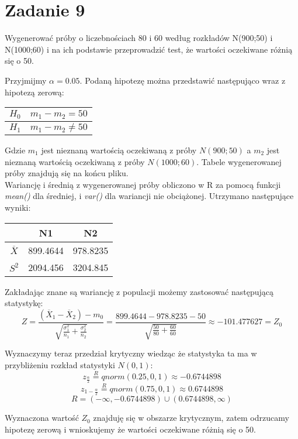 \documentclass{article}
\begin{document}
\newpage
\section{Zadanie 9}
Wygenerować próby o liczebnościach 80 i 60 według rozkładów N(900;50) i N(1000;60) i na ich podstawie przeprowadzić test, że wartości oczekiwane różnią się o 50. \\ \par

Przyjmijmy $\alpha = 0.05$. Podaną hipotezę można przedstawić następująco wraz z hipotezą zerową:
\begin{center} \begin{tabular}{|c|c|} \hline
$H_0$ & $m_1 - m_2 = 50$ \\ \hline
$H_1$ & $m_1 - m_2 \neq 50$ \\ \hline
\end{tabular} \end{center}
Gdzie $m_1$ jest nieznaną wartością oczekiwaną z próby $N(900;50)$ a $m_2$ jest nieznaną wartością oczekiwaną z próby  $N(1000;60)$. Tabele wygenerowanej próby znajdują się na końcu pliku. \\
Wariancję i średnią z wygenerowanej próby obliczono w R za pomocą funkcji \textit{mean()} dla średniej, i \textit{var()} dla wariancji nie  obciążonej. Utrzymano następujące wyniki:
\begin{center} \begin{tabular}{|c|c|c|} \hline
& N1 & N2 \\ \hline
$\overline{X}$ & 899.4644 & 978.8235 \\ \hline
$S^2$ & 2094.456 & 3204.845 \\ \hline
\end{tabular} \end{center}

Zakładając znane są wariancję z populacji możemy zastosować następującą statystykę:
\[Z = \frac{(\overline{X}_1 - \overline{X}_2) - m_0}{\sqrt{ \frac{\sigma_1^2}{n_1} + \frac{\sigma_2^2}{n_2} }} = \frac{899.4644 - 978.8235 - 50}{\sqrt{\frac{50}{80} + \frac{60}{60} }} \approx -101.477627 = Z_0\]

Wyznaczymy teraz przedział krytyczny wiedząc że statystyka ta ma w przybliżeniu rozkład statystyki $N(0,1)$:
\[ z_{\frac{\alpha}{2}} \overset{R}{=} qnorm(0.25, 0, 1) \approx -0.6744898 \]
\[ z_{1 - \frac{\alpha}{2}} \overset{R}{=} qnorm(0.75, 0, 1) \approx 0.6744898 \]
\[ R = (-\infty, -0.6744898) \cup (0.6744898, \infty) \]

Wyznaczona wartość $Z_0$ znajduję się w obszarze krytycznym, zatem odrzucamy hipotezę zerową i wnioskujemy że wartości oczekiwane różnią się o 50.
\end{document}
